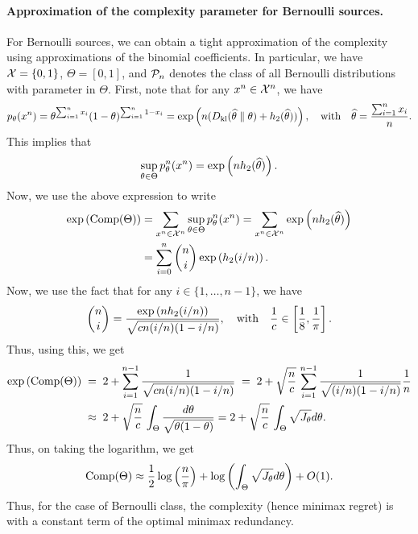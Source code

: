         \paragraph{Approximation of the complexity parameter for \iid Bernoulli sources.} For \iid Bernoulli sources, we can obtain a tight approximation of the complexity using approximations of the binomial coefficients. In particular, we have $\mathcal{X} = \{0, 1\}$, $\Theta = [0,1]$, and $\mathcal{P}_n$ denotes the class of all \iid Bernoulli distributions with parameter in $\Theta$. First, note that for any $x^n \in \mathcal{X}^n$, we have 
        \begin{align}
            p_{\theta}(x^n) = \theta^{\sum_{i=1}^n x_i}(1-\theta)^{\sum_{i=1}^n 1-x_i} = \exp \left( n (D_{\text{kl}}(\widehat{\theta} \parallel \theta) + h_2(\widehat{\theta}) )\right),  \quad \text{with} \quad \widehat{\theta} = \frac{\sum_{i=1}^n x_i}{n}. 
        \end{align}
        This implies that 
        \begin{align}
            \sup_{\theta \in \Theta} p_{\theta}^n(x^n) = \exp \left( n h_2(\widehat{\theta}) \right). 
        \end{align}
        Now, we use the above expression to write
        \begin{align}
            \exp \left( \text{Comp}(\Theta) \right) &= \sum_{x^n \in \mathcal{X}^n}\sup_{\theta \in \Theta} p_{\theta}^n(x^n) = \sum_{x^n \in \mathcal{X}^n} \exp \left( n h_2(\widehat{\theta}) \right)  \\
            & = \sum_{i=0}^n {n \choose i} \exp \left( h_2(i/n) \right). 
        \end{align}
        Now, we use the fact that for any $i \in \{1, \ldots, n-1\}$, we have 
        \begin{align}
            {n \choose i} = \frac{ \exp \left( n h_2(i/n) \right)}{\sqrt{cn (i/n) (1-i/n)}}, \quad \text{with} \quad \frac{1}{c} \in \left[ \frac{1}{8}, \frac{1}{\pi} \right]. 
        \end{align}
        Thus, using this, we get 
        \begin{align}
            \exp \left( \text{Comp}(\Theta) \right)  &\;=\; 2 +  \sum_{i=1}^{n-1} \frac{1}{ \sqrt{c n (i/n)(1-i/n)}} \;=\; 2 +  \sqrt{\frac{n}{c}} \, \sum_{i=1}^{n-1} \frac{1}{ \sqrt{(i/n)(1-i/n)}} \frac{1}{n} \\
            &\;\approx \; 2 +  \sqrt{\frac{n}{c}} \, \int_{\Theta} \frac{d\theta}{\sqrt{\theta(1-\theta)}} = 2 +  \sqrt{\frac{n}{c}} \, \int_{\Theta} \sqrt{J_\theta} d\theta.
        \end{align}
        Thus, on taking the logarithm, we get 
        \begin{align}
            \text{Comp}(\Theta) \approx \frac{1}{2} \log \left( \frac{n}{\pi} \right) + \log \left( \int_{\Theta} \sqrt{J_\theta} d \theta \right) + O(1). 
        \end{align}
        Thus, for the case of \iid Bernoulli class, the complexity (hence minimax regret) is with a constant term of the optimal minimax redundancy. 

